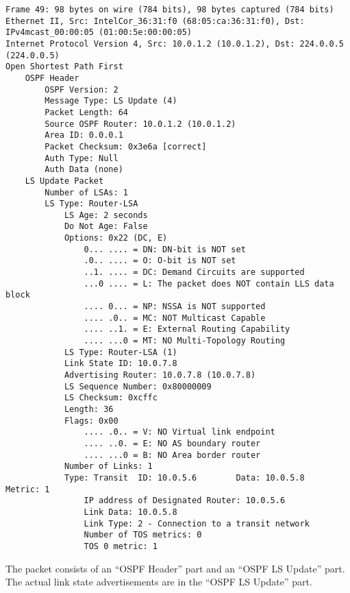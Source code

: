\fi %

\begin{lstlisting}
Frame 49: 98 bytes on wire (784 bits), 98 bytes captured (784 bits)
Ethernet II, Src: IntelCor_36:31:f0 (68:05:ca:36:31:f0), Dst: IPv4mcast_00:00:05 (01:00:5e:00:00:05)
Internet Protocol Version 4, Src: 10.0.1.2 (10.0.1.2), Dst: 224.0.0.5 (224.0.0.5)
Open Shortest Path First
    OSPF Header
        OSPF Version: 2
        Message Type: LS Update (4)
        Packet Length: 64
        Source OSPF Router: 10.0.1.2 (10.0.1.2)
        Area ID: 0.0.0.1
        Packet Checksum: 0x3e6a [correct]
        Auth Type: Null
        Auth Data (none)
    LS Update Packet
        Number of LSAs: 1
        LS Type: Router-LSA
            LS Age: 2 seconds
            Do Not Age: False
            Options: 0x22 (DC, E)
                0... .... = DN: DN-bit is NOT set
                .0.. .... = O: O-bit is NOT set
                ..1. .... = DC: Demand Circuits are supported
                ...0 .... = L: The packet does NOT contain LLS data block
                .... 0... = NP: NSSA is NOT supported
                .... .0.. = MC: NOT Multicast Capable
                .... ..1. = E: External Routing Capability
                .... ...0 = MT: NO Multi-Topology Routing
            LS Type: Router-LSA (1)
            Link State ID: 10.0.7.8
            Advertising Router: 10.0.7.8 (10.0.7.8)
            LS Sequence Number: 0x80000009
            LS Checksum: 0xcffc
            Length: 36
            Flags: 0x00
                .... .0.. = V: NO Virtual link endpoint
                .... ..0. = E: NO AS boundary router
                .... ...0 = B: NO Area border router
            Number of Links: 1
            Type: Transit  ID: 10.0.5.6        Data: 10.0.5.8        Metric: 1
                IP address of Designated Router: 10.0.5.6
                Link Data: 10.0.5.8
                Link Type: 2 - Connection to a transit network
                Number of TOS metrics: 0
                TOS 0 metric: 1
\end{lstlisting}

The packet consists of an ``OSPF Header'' part and an ``OSPF LS Update'' part. The actual link state advertisements are in the ``OSPF LS Update'' part.

